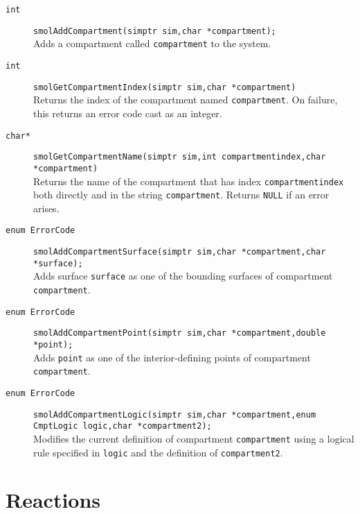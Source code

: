\documentclass {book}
\begin{document}
\begin{description}

\item[\texttt{int}]
\texttt{smolAddCompartment(simptr sim,char *compartment);}
\hfill \\
Adds a compartment called \texttt{compartment} to the system.

\item[\texttt{int}]
\texttt{smolGetCompartmentIndex(simptr sim,char *compartment)}
\hfill \\
Returns the index of the compartment named \texttt{compartment}. On failure, this returns an error code cast as an integer.

\item[\texttt{char*}]
\texttt{smolGetCompartmentName(simptr sim,int compartmentindex,char *compartment)}
\hfill \\
Returns the name of the compartment that has index \texttt{compartmentindex} both directly and in the string \texttt{compartment}. Returns \texttt{NULL} if an error arises.

\item[\texttt{enum ErrorCode}]
\texttt{smolAddCompartmentSurface(simptr sim,char *compartment,char *surface);}
\hfill \\
Adds surface \texttt{surface} as one of the bounding surfaces of compartment \texttt{compartment}.

\item[\texttt{enum ErrorCode}]
\texttt{smolAddCompartmentPoint(simptr sim,char *compartment,double *point);}
\hfill \\
Adds \texttt{point} as one of the interior-defining points of compartment \texttt{compartment}.

\item[\texttt{enum ErrorCode}]
\texttt{smolAddCompartmentLogic(simptr sim,char *compartment,enum CmptLogic logic,char *compartment2);}
\hfill \\
Modifies the current definition of compartment \texttt{compartment} using a logical rule specified in \texttt{logic} and the definition of \texttt{compartment2}.

\end{description}

\section{Reactions}
\end{document}
